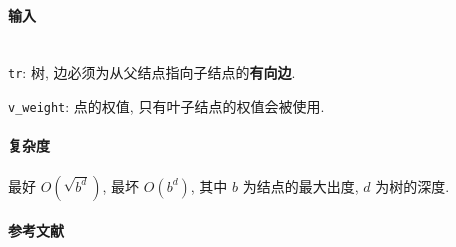 \paragraph{输入}~\\

\verb|tr|: 树, 边必须为从父结点指向子结点的\textbf{有向边}.

\verb|v_weight|: 点的权值, 只有叶子结点的权值会被使用.

\paragraph{复杂度}

最好 \(O\left(\sqrt{b^d}\right)\), 最坏 \(O\left(b^d\right)\), 其中 \(b\) 为结点的最大出度, \(d\) 为树的深度.

\paragraph{参考文献}

\cite{enwiki:1188156145}
